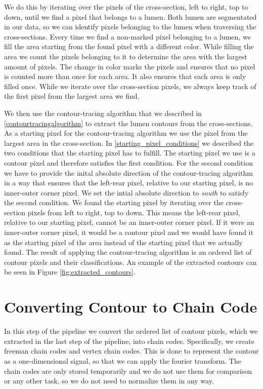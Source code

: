 \documentclass[thesis.tex]{subfiles}
\begin{document}
We do this by iterating over the pixels of the cross-section, left to right, top to down, until we find a pixel that belongs to a lumen. Both lumen are segmentated in our data, so we can identify pixels belonging to the lumen when traversing the cross-sections. Every time we find a non-marked pixel belonging to a lumen, we fill the area starting from the found pixel with a different color. While filling the area we count the pixels belonging to it to determine the area with the largest amount of pixels. The change in color marks the pixels and ensures that no pixel is counted more than once for each area. It also ensures that each area is only filled once. While we iterate over the cross-section pixels, we always keep track of the first pixel from the largest area we find.   

We then use the contour-tracing algorithm that we described in \ref{contourtracingalgorithm} to extract the lumen contours from the cross-sections. As a starting pixel for the contour-tracing algorithm we use the pixel from the largest area in the cross-section. In \ref{starting_pixel_conditions} we described the two conditions that the starting pixel has to fulfill. The starting pixel we use is a contour pixel and therefore satisfies the first condition. For the second condition we have to provide the inital absolute direction of the contour-tracing algorithm in a way that ensures that the left-rear pixel, relative to our starting pixel, is no inner-outer corner pixel. We set the intial absolute direction to \textit{south} to satisfy the second condition. We found the starting pixel by iterating over the cross-section pixels from left to right, top to down. This means the left-rear pixel, relative to our starting pixel, cannot be an inner-outer corner pixel. If it were an inner-outer corner pixel, it would be a contour pixel and we would have found it as the starting pixel of the area instead of the starting pixel that we actually found. The result of applying the contour-tracing algorithm is an ordered list of contour pixels and their classifications.
An example of the extracted contours can be seen in Figure \ref{fig:extracted_contours}.

\section{Converting Contour to Chain Code}
\label{section:chaincode}
In this step of the pipeline we convert the ordered list of contour pixels, which we extracted in the last step of the pipeline, into chain codes.  Specifically, we create freeman chain codes and vertex chain codes. This is done to represent the contour as a one-dimensional signal, so that we can apply the fourier transform. The chain codes are only stored temporarily and we do not use them for comparison or any other task, so we do not need to normalize them in any way. \\
\end{document}
